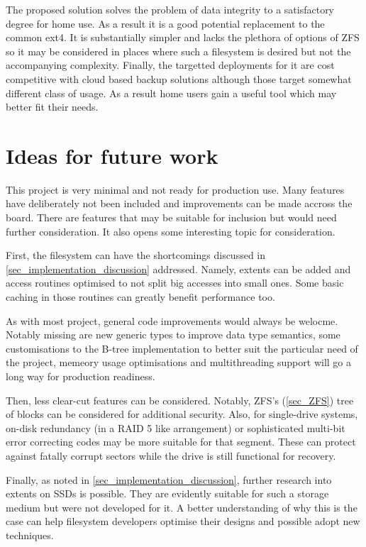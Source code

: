         The proposed solution solves the problem of data integrity to a
        satisfactory degree for home use. As a result it is a good potential
        replacement to the common ext4. It is substantially simpler and lacks
        the plethora of options of ZFS so it may be considered in places where
        such a filesystem is desired but not the accompanying complexity.
        Finally, the targetted deployments for it are cost competitive with
        cloud based backup solutions although those target somewhat different
        class of usage. As a result home users gain a useful tool which may
        better fit their needs.

    \section{Ideas for future work}

        This project is very minimal and not ready for production use. Many
        features have deliberately not been included and improvements can be
        made accross the board. There are features that may be suitable for
        inclusion but would need further consideration. It also opens some
        interesting topic for consideration.

        First, the filesystem can have the shortcomings discussed in
        \ref{sec_implementation_discussion} addressed. Namely, extents can be
        added and access routines optimised to not split big accesses into
        small ones. Some basic caching in those routines can greatly benefit
        performance too.

        As with most project, general code improvements would always be
        welocme. Notably missing are new generic types to improve data type
        semantics, some customisations to the B-tree implementation to better
        suit the particular need of the project, memeory usage optimisations
        and multithreading support will go a long way for production readiness.

        Then, less clear-cut features can be considered. Notably, ZFS's
        (\ref{sec_ZFS}) tree of blocks can be considered for additional
        security. Also, for single-drive systems, on-disk redundancy (in a RAID
        5 like arrangement) or sophisticated multi-bit error correcting codes
        may be more suitable for that segment. These can protect against
        fatally corrupt sectors while the drive is still functional for
        recovery.


        Finally, as noted in \ref{sec_implementation_discussion}, further
        research into extents on SSDs is possible. They are evidently suitable
        for such a storage medium but were not developed for it. A better
        understanding of why this is the case can help filesystem developers
        optimise their designs and possible adopt new techniques.
